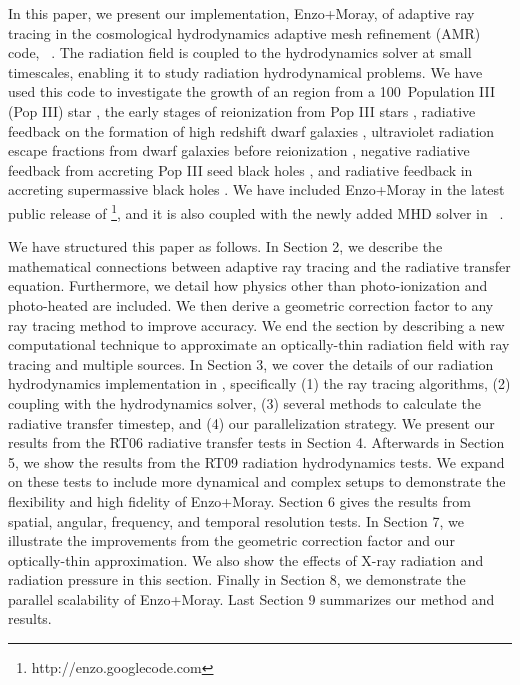 \documentclass[useAMS,usenatbib,a4paper]{mn2e}
\begin{document}
In this paper, we present our implementation, Enzo+Moray, of adaptive
ray tracing \citep{Abel02_RT} in the cosmological hydrodynamics
adaptive mesh refinement (AMR) code, \enzo~\citep{BryanNorman1997,
  OShea2004}.  The radiation field is coupled to the hydrodynamics
solver at small timescales, enabling it to study radiation
hydrodynamical problems.  We have used this code to investigate the
growth of an \hii region from a 100\Ms~Population III (Pop III) star
\citep{Abel07}, the early stages of reionization from Pop III stars
\citep{Wise08_Reion}, radiative feedback on the formation of high
redshift dwarf galaxies \citep{Wise08_Gal, Wise10_Gal}, ultraviolet
radiation escape fractions from dwarf galaxies before reionization
\citep{Wise09}, negative radiative feedback from accreting Pop III
seed black holes \citep{Alvarez09}, and radiative feedback in
accreting supermassive black holes \citep[][in prep.]{Kim11}.  We have
included Enzo+Moray in the latest public release of
\enzo\footnote{http://enzo.googlecode.com}, and it is also coupled
with the newly added MHD solver in \enzo~\citep{Wang09}.

We have structured this paper as follows.  In Section 2, we describe
the mathematical connections between adaptive ray tracing and the
radiative transfer equation.  Furthermore, we detail how physics other
than photo-ionization and photo-heated are included.  We then derive a
geometric correction factor to any ray tracing method to improve
accuracy.  We end the section by describing a new computational
technique to approximate an optically-thin radiation field with ray
tracing and multiple sources.  In Section 3, we cover the details of
our radiation hydrodynamics implementation in \enzo, specifically (1)
the ray tracing algorithms, (2) coupling with the hydrodynamics
solver, (3) several methods to calculate the radiative transfer
timestep, and (4) our parallelization strategy.  We present our
results from the RT06 radiative transfer tests in Section 4.
Afterwards in Section 5, we show the results from the RT09 radiation
hydrodynamics tests.  We expand on these tests to include more
dynamical and complex setups to demonstrate the flexibility and high
fidelity of Enzo+Moray.  Section 6 gives the results from spatial,
angular, frequency, and temporal resolution tests.  In Section 7, we
illustrate the improvements from the geometric correction factor and
our optically-thin approximation.  We also show the effects of X-ray
radiation and radiation pressure in this section.  Finally in Section
8, we demonstrate the parallel scalability of Enzo+Moray.  Last
Section 9 summarizes our method and results.
\end{document}
